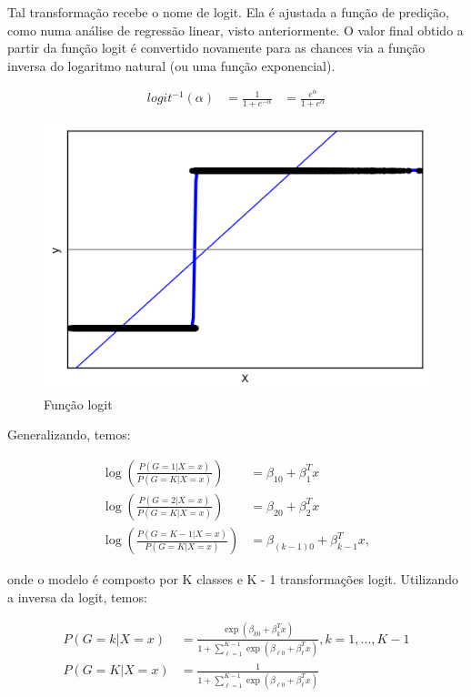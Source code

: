 Tal transformação recebe o nome de logit. Ela é ajustada a função de predição, como numa análise de regressão linear, visto anteriormente. O valor final obtido a partir da função logit é convertido novamente para as chances via a função inversa do logaritmo natural (ou uma função exponencial).

\begin{equation}
  \label{eq:t}
  \begin{aligned}
    logit^{-1}(\alpha) &= \frac{1}{1+e^{-\alpha}} &= \frac{e^{\alpha}}{1+e^{\alpha}}
  \end{aligned}
\end{equation}

\begin{figure}[!ht]
\caption{Fun\c c\~ao logit}
\centerline{\includegraphics[width=.6\textwidth]{img/logit}}
\end{figure}


Generalizando, temos:

\begin{equation}
  \label{eq:t}
  \begin{aligned}
    \log\left ( \frac{P(G = 1 | X = x)}{P(G = K | X = x)} \right ) &= \beta_{10}+\beta_{1}^{T}x\\
    \log\left ( \frac{P(G = 2 | X = x)}{P(G = K | X = x)} \right ) &= \beta_{20}+\beta_{2}^{T}x\\
    \log\left ( \frac{P(G = K-1 | X = x)}{P(G = K | X = x)} \right ) &= \beta_{(k-1)0}+\beta_{k-1}^{T}x,
  \end{aligned}
\end{equation}

onde o modelo é composto por K classes e K - 1 transformações logit. Utilizando a inversa da logit, temos:

\begin{equation}
  \label{eq:t}
  \begin{aligned}
    P(G = k | X = x) &= \frac{\exp \left ( \beta_{k0}+\beta_{k}^{T}x \right )}{1 + \sum_{\ell=1}^{K - 1}\exp \left ( \beta_{\ell0}+\beta_{\ell}^{T}x \right )}, k = 1, ..., K - 1\\
    P(G = K | X = x) &= \frac{1}{1 + \sum_{\ell=1}^{K - 1}\exp \left ( \beta_{\ell0}+\beta_{\ell}^{T}x \right )}
  \end{aligned}
\end{equation}

